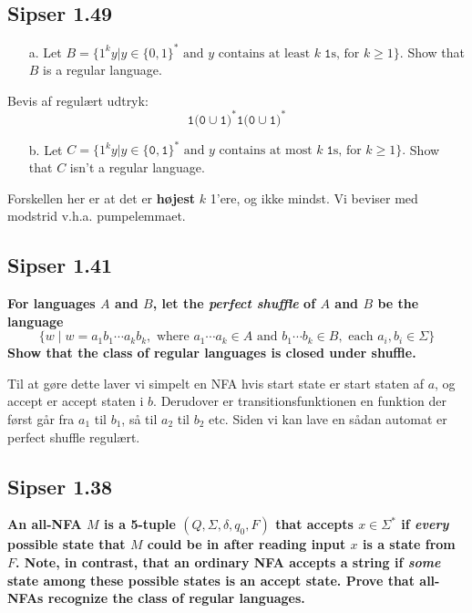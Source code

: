 \subsection{Sipser 1.49}%
\label{subsec:sipser1.49}

\begin{enumerate}
  \item[a.] Let  $B = \{1^{k}y | y \in \{0,1\}^{*} \text{ and } y \text{ contains at least } k \;\mathtt{ 1} \text{s, for } k \ge 1\}$. Show that $B$ is a regular language.
\end{enumerate}

Bevis af regulært udtryk:
\[  \mathtt{1(0} \cup \mathtt{1)}^{*} \mathtt{1(0} \cup \mathtt{1)}^{*} \]

\begin{enumerate}
  \item[b.] Let $C = \{1^{k}y | y \in \{\mathtt{0,1}\}^{*} \text{ and } y \text{ contains at most }k \;\mathtt{1} \text{s, for } k \ge 1\}.$
        Show that $C$ isn't a regular language.
\end{enumerate}

Forskellen her er at det er \textbf{højest} $k$ 1'ere, og ikke mindst.
Vi beviser med modstrid v.h.a. pumpelemmaet.


\subsection{Sipser 1.41}%
\label{subsec:sipser1.41}
\textbf{For languages $A$ and $B$, let the \textit{perfect shuffle} of $A$ and $B$ be the language}
\[ \{w \; | \; w = a_{1}b_{1} \cdots a_{k}b_{k}, \text{ where } a_{1} \cdots a_{k} \in A \text{ and }b_{1} \cdots b_{k} \in B, \text{ each }a_{i}, b_{i} \in \Sigma\} \]
\textbf{Show that the class of regular languages is closed under shuffle.}

Til at gøre dette laver vi simpelt en NFA hvis start state er start staten af $a$, og accept er accept staten i $b$. Derudover er transitionsfunktionen en funktion der først går fra $a_{1}$ til $b_{1}$, så til $a_{2}$ til $b_{2}$ etc. Siden vi kan lave en sådan automat er perfect shuffle regulært.

\subsection{Sipser 1.38}%
\label{subsec:sipser1.38}

\textbf{An all-NFA $M$ is a 5-tuple $(Q, \Sigma, \delta, q_{0}, F)$ that accepts $x \in \Sigma^{*}$ if \textit{every} possible state that $M$ could be in after reading input $x$ is a state from $F$. Note, in contrast, that an ordinary   NFA accepts a string if \textit{some} state among these possible states is an accept state. Prove that all-NFAs recognize the class of regular languages.}

